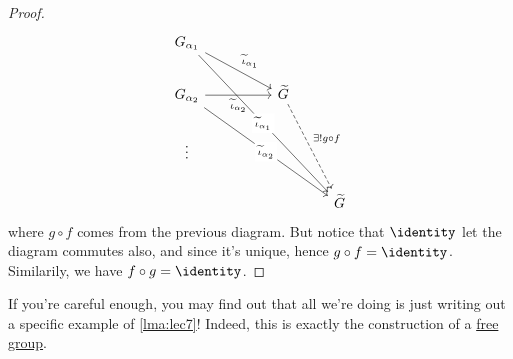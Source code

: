 \begin{remark}
\begin{proof}
\[\begin{tikzcd}
				{G_{\alpha_1}} \\
				{G_{\alpha_2}} && {\widetilde{G}} \\
				\vdots \\
				&&& {\widetilde{G}}
				\arrow["{\widetilde{\iota}_{\alpha_1}}", from=1-1, to=2-3]
				\arrow["{\widetilde{\iota}_{\alpha_2}}"', from=2-1, to=2-3]
				\arrow["{\exists ! g\circ f}", dashed, from=2-3, to=4-4]
				\arrow["{\widetilde{\iota}_{\alpha_1}}"{description}, from=1-1, to=4-4]
				\arrow["{\widetilde{\iota}_{\alpha_2}}"{description}, from=2-1, to=4-4]
			\end{tikzcd}\]
		where \(g\circ f\) comes from the previous diagram. But notice that \(\identity_{} \) let the diagram commutes also, and since it's unique, hence \(g\circ f = \identity_{} \). Similarily,
		we have \(f\circ g = \identity_{} \).
	\end{proof}
\end{remark}

If you're careful enough, you may find out that all we're doing is just writing out a specific example of \autoref{lma:lec7}! Indeed, this is exactly the construction of a
\hyperref[def:free-group]{free group}.


